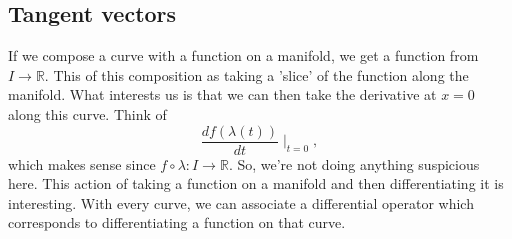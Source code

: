 \subsection{Tangent vectors}
If we compose a curve with a function on a manifold, we get a function from $I \rightarrow \mathbb{R}$. This of this composition as taking a 'slice' of the function along the manifold. What interests us is that we can then take the derivative at $x = 0$ along this curve. 
Think of 
\[
	\frac{d f (\lambda (t))}{dt}\mid_{t = 0}, 
\]
which makes sense since $f \circ \lambda : I \rightarrow \mathbb{R}$. So, we're not doing anything suspicious here. 
This action of taking a function on a manifold and then differentiating it is interesting. With every curve, we can associate a differential operator which corresponds to differentiating a function on that curve. 

